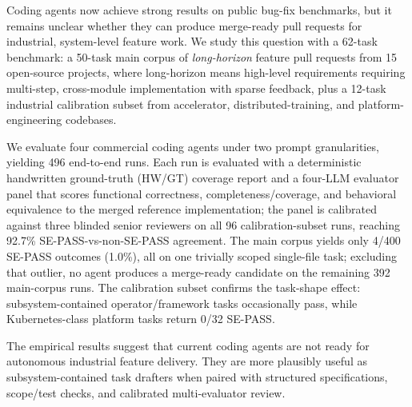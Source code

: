 Coding agents now achieve strong results on public bug-fix benchmarks, but it remains unclear whether they can produce merge-ready pull requests for industrial, system-level feature work. We study this question with a 62-task benchmark: a 50-task main corpus of \emph{long-horizon} feature pull requests from 15 open-source projects, where long-horizon means high-level requirements requiring multi-step, cross-module implementation with sparse feedback, plus a 12-task industrial calibration subset from accelerator, distributed-training, and platform-engineering codebases.

We evaluate four commercial coding agents under two prompt granularities, yielding 496 end-to-end runs. Each run is evaluated with a deterministic handwritten ground-truth (HW/GT) coverage report and a four-LLM evaluator panel that scores functional correctness, completeness/coverage, and behavioral equivalence to the merged reference implementation; the panel is calibrated against three blinded senior reviewers on all 96 calibration-subset runs, reaching 92.7\% SE-PASS-vs-non-SE-PASS agreement. The main corpus yields only 4/400 SE-PASS outcomes (1.0\%), all on one trivially scoped single-file task; excluding that outlier, no agent produces a merge-ready candidate on the remaining 392 main-corpus runs. The calibration subset confirms the task-shape effect: subsystem-contained operator/framework tasks occasionally pass, while Kubernetes-class platform tasks return 0/32 SE-PASS.

The empirical results suggest that current coding agents are not ready for autonomous industrial feature delivery. They are more plausibly useful as subsystem-contained task drafters when paired with structured specifications, scope/test checks, and calibrated multi-evaluator review.
